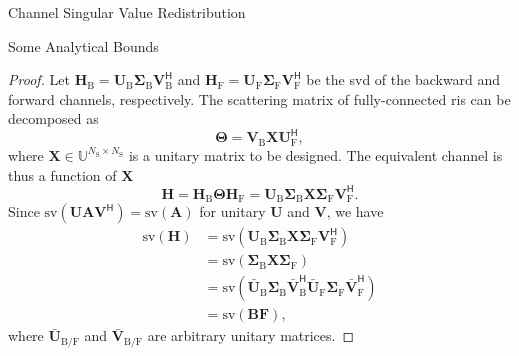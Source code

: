 \documentclass[journal]{IEEEtran}
\begin{document}
\begin{section}{Channel Singular Value Redistribution}
\begin{subsection}{Some Analytical Bounds}
		\begin{proof}
			Let $\mathbf{H}_\mathrm{B} = \mathbf{U}_\mathrm{B} \mathbf{\Sigma}_\mathrm{B} \mathbf{V}_\mathrm{B}^\mathsf{H}$ and $\mathbf{H}_\mathrm{F} = \mathbf{U}_\mathrm{F} \mathbf{\Sigma}_\mathrm{F} \mathbf{V}_\mathrm{F}^\mathsf{H}$ be the \gls{svd} of the backward and forward channels, respectively.
			The scattering matrix of fully-connected \gls{ris} can be decomposed as
			\begin{equation}
				\mathbf{\Theta} = \mathbf{V}_\mathrm{B} \mathbf{X} \mathbf{U}_\mathrm{F}^\mathsf{H},
				\label{eq:scattering_fc}
			\end{equation}
			where $\mathbf{X} \in \mathbb{U}^{N_\mathrm{S} \times N_\mathrm{S}}$ is a unitary matrix to be designed.
			The equivalent channel is thus a function of $\mathbf{X}$
			\begin{equation}
				\mathbf{H} = \mathbf{H}_\mathrm{B} \mathbf{\Theta} \mathbf{H}_\mathrm{F} = \mathbf{U}_\mathrm{B} \mathbf{\Sigma}_\mathrm{B} \mathbf{X} \mathbf{\Sigma}_\mathrm{F} \mathbf{V}_\mathrm{F}^\mathsf{H}.
				\label{eq:channel_equivalent_fc}
			\end{equation}
			Since $\mathrm{sv}(\mathbf{U} \mathbf{A} \mathbf{V}^\mathsf{H}) = \mathrm{sv}(\mathbf{A})$ for unitary $\mathbf{U}$ and $\mathbf{V}$, we have
			\begin{align*}
				\mathrm{sv}(\mathbf{H}) & = \mathrm{sv}(\mathbf{U}_\mathrm{B} \mathbf{\Sigma}_\mathrm{B} \mathbf{X} \mathbf{\Sigma}_\mathrm{F} \mathbf{V}_\mathrm{F}^\mathsf{H})\\
				& = \mathrm{sv}(\mathbf{\Sigma}_\mathrm{B} \mathbf{X} \mathbf{\Sigma}_\mathrm{F})\\
				& = \mathrm{sv}(\bar{\mathbf{U}}_\mathrm{B} \mathbf{\Sigma}_\mathrm{B} \mathbf{\bar{V}}_\mathrm{B}^\mathsf{H} \bar{\mathbf{U}}_\mathrm{F} \mathbf{\Sigma}_\mathrm{F} \mathbf{\bar{V}}_\mathrm{F}^\mathsf{H})\\
				& = \mathrm{sv}(\mathbf{BF}),
			\end{align*}
			where $\bar{\mathbf{U}}_{\mathrm{B}/\mathrm{F}}$ and $\bar{\mathbf{V}}_{\mathrm{B}/\mathrm{F}}$ are arbitrary unitary matrices.
		\end{proof}


\end{subsection}
\end{section}
\end{document}
